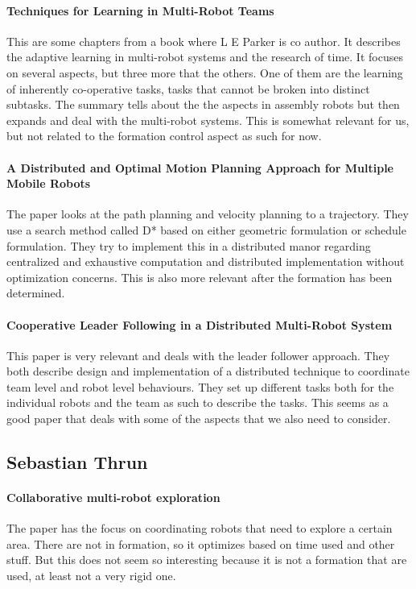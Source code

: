 \paragraph{Techniques for Learning in Multi-Robot Teams}
This are some chapters from a book where L E Parker is co author. It describes the adaptive learning in multi-robot systems and the research of time. It focuses on several aspects, but three more that the others. One of them are the learning of inherently co-operative tasks, tasks that cannot be broken into distinct subtasks. The summary tells about the the aspects in assembly robots but then expands and deal with the multi-robot systems.
This is somewhat relevant for us, but not related to the formation control aspect as such for now.

\paragraph{A Distributed and Optimal Motion Planning Approach for Multiple Mobile Robots}
The paper looks at the path planning and velocity planning to a trajectory. They use a search method called D* based on either geometric formulation or schedule formulation. They try to implement this in a distributed manor regarding centralized and exhaustive computation and distributed implementation without optimization concerns.
This is also more relevant after the formation has been determined.

\paragraph{Cooperative Leader Following in a Distributed Multi-Robot System}
This paper is very relevant and deals with the leader follower approach. They both describe design and implementation of a distributed technique to coordinate team level and robot level behaviours. They set up different tasks both for the individual robots and the team as such to describe the tasks.
This seems as a good paper that deals with some of the aspects that we also need to consider.


\subsection{Sebastian Thrun}

{\vskip0pt\color{gray}
\paragraph{Collaborative multi-robot exploration}
The paper has the focus on coordinating robots that need to explore a certain area. There are not in formation, so it optimizes based on time used and other stuff. But this does not seem so interesting because it is not a formation that are used, at least not a very rigid one.}

